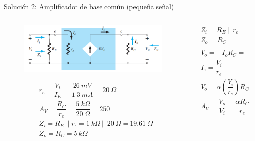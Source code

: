 \documentclass[t,aspectratio=169]{beamer}
\begin{document}
\begin{frame}{Solución 2: Amplificador de base común (pequeña señal)}

\begin{columns}
\begin{column}{0.5\textwidth}

\begin{figure}[H]
    \centering
    \includegraphics[width=\textwidth]{figuras/modelo_re_base_comun_4.png}
\end{figure}
%
\begin{align*}
&r_e = \dfrac{V_t}{I_E} = \dfrac{26\ mV}{1.3\ mA} = 20\ \Omega \\
&A_V = \dfrac{R_C}{r_e} = \dfrac{5\ k\Omega}{20\ \Omega} = 250 \\
&Z_i = R_E \parallel r_e = 1\ k\Omega \parallel 20\ \Omega = 19.61\ \Omega \\
&Z_o = R_C = 5\ k\Omega \\
\end{align*}

\end{column}
\begin{column}{0.5\textwidth}
\begin{align*}
&\boxed{Z_i = R_E \parallel r_e} \\
&\boxed{Z_o = R_C} \\
& \\
&V_o = -I_o R_C = -(-I_C)R_C = \alpha I_E R_C \\
&I_e = \dfrac{V_i}{r_e} \\
&V_o = \alpha \left( \dfrac{V_i}{r_e} \right) R_C \\
&\boxed{A_V = \dfrac{V_o}{V_i} = \dfrac{\alpha R_C}{r_e} \approx \dfrac{R_C}{r_e}} \\
\end{align*}
\end{column}
\end{columns}

\end{frame}
\end{document}
